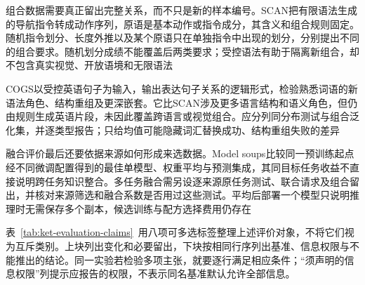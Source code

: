 组合数据需要真正留出完整关系，而不只是新的样本编号。SCAN把有限语法生成的导航指令转成动作序列，原语是基本动作或指令成分，其含义和组合规则固定。随机指令划分、长度外推以及某个原语只在单独指令中出现的划分，分别提出不同的组合要求。随机划分成绩不能覆盖后两类要求；受控语法有助于隔离新组合，却不包含真实视觉、开放语境和无限语法

COGS以受控英语句子为输入，输出表达句子关系的逻辑形式，检验熟悉词语的新语法角色、结构重组及更深嵌套。它比SCAN涉及更多语言结构和语义角色，但仍由规则生成英语片段，未因此覆盖跨语言或视觉组合。应分列同分布测试与组合泛化集，并逐类型报告；只给均值可能隐藏词汇替换成功、结构重组失败的差异

\begin{samepage}
融合评价最后还要依据来源如何形成来选数据。Model soups比较同一预训练起点经不同微调配置得到的最佳单模型、权重平均与预测集成，其同目标任务收益不直接说明跨任务知识整合。多任务融合需另设逐来源原任务测试、联合请求及组合留出，并核对来源筛选和融合系数是否用过这些测试。平均后部署一个模型只说明推理时无需保存多个副本，候选训练与配方选择费用仍存在

\end{samepage}

表~\ref{tab:ket-evaluation-claims}~用八项可多选标签整理上述评价对象，不将它们视为互斥类别。上块列出变化和必要留出，下块按相同行序列出基准、信息权限与不能推出的结论。同一实验若检验多项主张，就要逐行满足相应条件；“须声明的信息权限”列提示应报告的权限，不表示同名基准默认允许全部信息。

